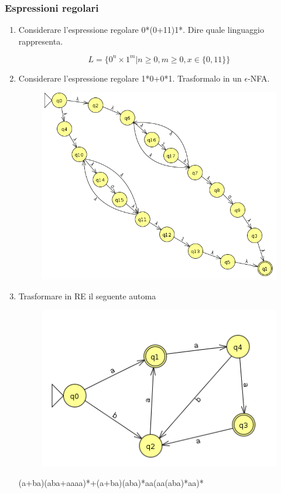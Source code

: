 \subsubsection{Espressioni regolari}
\begin{enumerate}
\item Considerare l'espressione regolare 0*(0+11)1*. Dire quale linguaggio rappresenta.

  \[ L=\{ 0^n \times 1^m | n \geq 0, m \geq 0, x \in \{0,11\} \} \]
  
\newpage
\item Considerare l'espressione regolare 1*0+0*1. Trasformalo in un $\epsilon$-NFA.
  \begin{figure}[ht]
    \includegraphics[scale =0.4]{media/esercizio3jflap.jff.png}
    \centering
  \end{figure}

\item Trasformare in RE il seguente automa

  \begin{figure}[ht]
    \includegraphics[scale =0.4]{media/nfa2re.jff.png}
    \centering
  \end{figure}
  (a+ba)(aba+aaaa)*+(a+ba)(aba)*aa(aa(aba)*aa)*


\end{enumerate}
